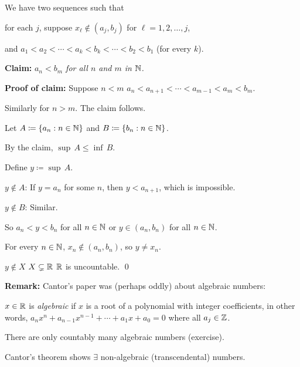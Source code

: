 \documentclass[10pt,aspectratio=149]{beamer}
\begin{document}
\begin{frame}
We have two sequences such that

for each $j$, suppose $x_\ell \notin (a_{j},b_{j})$ for $\ell=1,2,\ldots,j$,

and 
$a_1 < a_2 < \cdots < a_{k} < b_{k} < \cdots < b_2 < b_1$ (for every $k$).

\medskip
\pause

\textbf{Claim:} \emph{$a_n < b_m$ for all $n$ and $m$ in ${\mathbb{N}}$.}

\pause
\textbf{Proof of claim:}
Suppose $n < m$ \pause \wthus
$a_n < a_{n+1} < \cdots < a_{m-1} < a_m < b_m$.

\pause
Similarly for $n > m$.  The claim follows.

\medskip
\pause

Let $A \coloneqq \{ a_n : n \in {\mathbb{N}} \}$ and $B \coloneqq \{ b_n : n \in {\mathbb{N}} \}$.

\pause
By the claim, \quad $\sup\, A \leq \inf\, B$.

\pause
Define $y \coloneqq \sup\, A$.

\pause
$y \notin A$: If $y=a_n$ for some $n$, then $y < a_{n+1}$, which is impossible.

\pause
$y \notin B$: Similar.

\pause
So $a_n < y < b_n$ for all $n \in {\mathbb{N}}$ \quad or \quad $y \in (a_n,b_n)$ for
all $n \in {\mathbb{N}}$.

\pause
For every $n \in {\mathbb{N}}$, $x_n \not\in (a_n,b_n)$, so $y \not= x_n$.

\pause
\thus \quad $y \notin X$ \pause \wthus $X \subsetneq {\mathbb{R}}$ \pause \wthus ${\mathbb{R}}$
is uncountable.
\qed
\end{frame}

\begin{frame}
\textbf{Remark:}
Cantor's paper was (perhaps oddly) about algebraic numbers:

\medskip
\pause

$x \in {\mathbb{R}}$ is \emph{algebraic} if $x$ is a root of a polynomial with
integer coefficients, in other words, $a_n x^n + a_{n-1} x^{n-1}  + \cdots
+ a_1 x + a_0 = 0$ where all $a_j \in {\mathbb{Z}}$.

\medskip
\pause

There are only countably many algebraic numbers (exercise).

\medskip
\pause

Cantor's theorem shows $\exists$ non-algebraic (transcendental)
numbers.

\end{frame}
\end{document}
